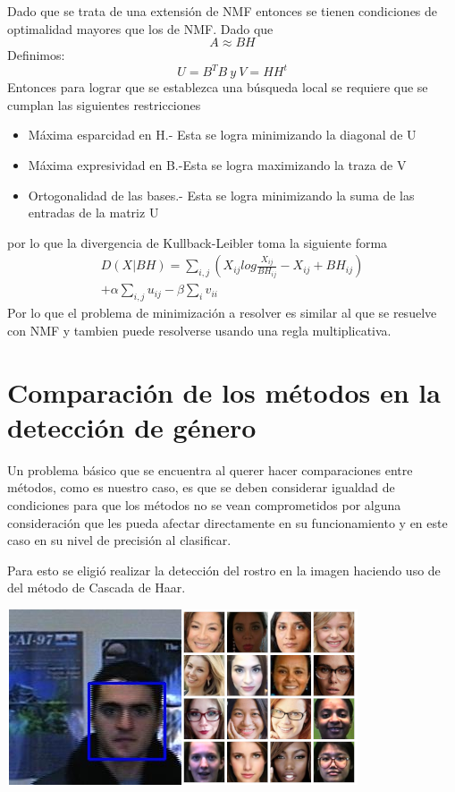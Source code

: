 \documentclass[a0,portrait]{a0poster}
\begin{document}
\begin{multicols}{3}
Dado que se trata de una extensión de NMF entonces se tienen condiciones de optimalidad mayores que los de NMF. Dado que $$A\approx BH$$ Definimos: $$U=B^T B \ y \ V=HH^t$$ Entonces para lograr que se establezca una búsqueda local se requiere que se cumplan las siguientes restricciones
\begin{itemize}
\item Máxima esparcidad en H.- Esta se logra minimizando la diagonal de U
\item Máxima expresividad en B.-Esta se logra maximizando la traza de V
\item Ortogonalidad de las bases.- Esta se logra minimizando la suma de las entradas de la matriz U
\end{itemize}
por lo que la divergencia de Kullback-Leibler toma la siguiente forma
\begin{multline*}D(X|BH)=\sum_{i,j}\left(X_{ij}log\frac{X_{ij}}{BH_{ij}} - X_{ij} + BH_{ij} \right) \\ +\alpha\sum_{i,j} u_{ij}-\beta\sum_{i}v_{ii}\end{multline*} Por lo que el problema de minimización a resolver es similar al que se resuelve con NMF y tambien puede resolverse usando una regla multiplicativa.

\section*{Comparaci\'on de los m\'etodos en la detecci\'on de g\'enero}
Un problema básico que se encuentra al querer hacer comparaciones entre métodos, como es nuestro caso, es que se deben considerar igualdad de condiciones para que los métodos no se vean comprometidos por alguna consideración que les pueda afectar directamente en su funcionamiento y en este caso en su nivel de precisión al clasificar.\newline

Para esto se eligi\'o realizar la detección del rostro en la imagen haciendo uso de del método de Cascada de Haar.\newline

\begin{center}\vspace{0.5cm}
\includegraphics[width=0.7\linewidth]{collage3}
\end{center}%



\end{multicols}
\end{document}
